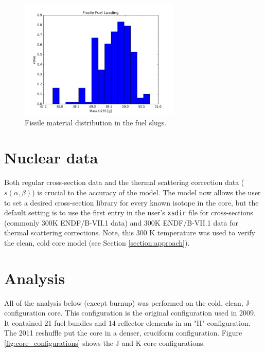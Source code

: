 \documentclass{UWNR_modeling}
\begin{document}
\begin{figure}[H]
  \centering
  \includegraphics[width=3in]{mass235.jpeg}
  \caption{Fissile material distribution in the fuel slugs.}
  \label{fig:235_dist}
\end{figure}

\section{Nuclear data}

Both regular cross-section data and the thermal scattering correction data ($s(\alpha,\beta)$) is crucial to the accuracy of the model. The model now allows the user to set a desired cross-section library for every known isotope in the core, but the default setting is to use the first entry in the user's \texttt{xsdir} file for cross-sections (commonly 300K ENDF/B-VII.1 data) and 300K ENDF/B-VII.1 data for thermal scattering corrections.  Note, this 300 K temperature was used to verify the clean, cold core model (see Section \ref{section:approach}). 

\section{Analysis}\label{section:analysis}
All of the analysis below (except burnup) was performed on the cold, clean, J-configuration core. This configuration is the original configuration used in 2009. It contained 21 fuel bundles and 14 reflector elements in an "H" configuration. The 2011 reshuffle put the core in a denser, cruciform configuration. Figure \ref{fig:core_configurations} shows the J and K core configurations.
\end{document}

